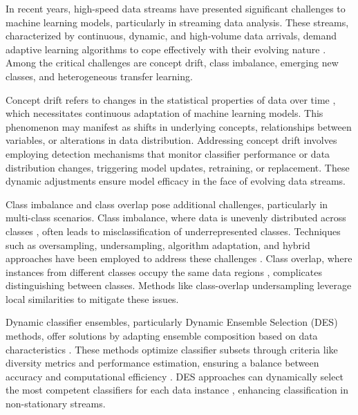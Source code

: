 In recent years, high-speed data streams have presented significant challenges to machine learning models, particularly in streaming data analysis. These streams, characterized by continuous, dynamic, and high-volume data arrivals, demand adaptive learning algorithms to cope effectively with their evolving nature \cite{yang2021concept, dong2019multistream, shan2018online}. Among the critical challenges are concept drift, class imbalance, emerging new classes, and heterogeneous transfer learning.  

Concept drift refers to changes in the statistical properties of data over time \cite{pan2009survey, zhuang2020comprehensive}, which necessitates continuous adaptation of machine learning models. This phenomenon may manifest as shifts in underlying concepts, relationships between variables, or alterations in data distribution. Addressing concept drift involves employing detection mechanisms that monitor classifier performance or data distribution changes, triggering model updates, retraining, or replacement. These dynamic adjustments ensure model efficacy in the face of evolving data streams.  

Class imbalance and class overlap pose additional challenges, particularly in multi-class scenarios. Class imbalance, where data is unevenly distributed across classes \cite{wang2018systematic, sun2009classification}, often leads to misclassification of underrepresented classes. Techniques such as oversampling, undersampling, algorithm adaptation, and hybrid approaches have been employed to address these challenges \cite{charte2015addressing, charte2015mlsmote, daniels2017addressing, liu2018making}. Class overlap, where instances from different classes occupy the same data regions \cite{bhowan2012evolving, galar2011review}, complicates distinguishing between classes. Methods like class-overlap undersampling leverage local similarities to mitigate these issues.  

Dynamic classifier ensembles, particularly Dynamic Ensemble Selection (DES)  methods, offer solutions by adapting ensemble composition based on data characteristics \cite{cruz2018dynamic}. These methods optimize classifier subsets through criteria like diversity metrics and performance estimation, ensuring a balance between accuracy and computational efficiency \cite{kuncheva2000clustering}. DES approaches can dynamically select the most competent classifiers for each data instance \cite{woloszynski2011probabilistic, lysiak2014optimal, cruz2017meta}, enhancing classification in non-stationary streams.  

